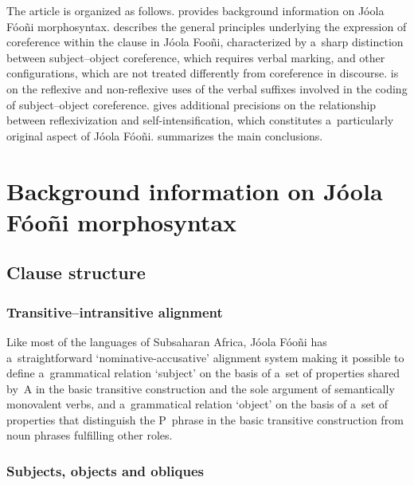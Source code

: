 \documentclass[output=paper]{langscibook}
\begin{document}
The article is organized as follows.   provides
background information on Jóola Fóoñi morphosyntax.
 describes the general principles
underlying the expression of coreference within the clause in Jóola Fooñi,
characterized by a~sharp distinction between subject--object coreference, which
requires verbal marking, and other configurations, which are not treated
differently from coreference in discourse.   is
on the reflexive and non-reflexive uses of the verbal suffixes involved in the
coding of subject--object coreference.  
gives additional precisions on the relationship between reflexivization and
self-intensification, which constitutes a~particularly original aspect of Jóola
Fóoñi.   summarizes the main conclusions.

\section{Background information on Jóola Fóoñi morphosyntax}%
\label{sec:Creissels:background}

\subsection{Clause structure}%
\label{sec:Creissels:clause-struct}

\subsubsection{Transitive--intransitive alignment}%
\label{sec:Creissels:transitive-alignment}

Like most of the languages of Subsaharan Africa, Jóola Fóoñi has
a~straightforward `nominative-accusative' alignment system making it possible to define a~grammatical relation `subject' on the basis of a~set of properties shared by~A in the basic transitive construction and the sole argument of semantically monovalent verbs, and a~grammatical relation `object' on the basis of a~set of properties that distinguish the P~phrase in the basic transitive construction from noun phrases fulfilling other roles.

\subsubsection{Subjects, objects and obliques}%
\label{sec:Creissels:subj-obj-obl}
\end{document}
